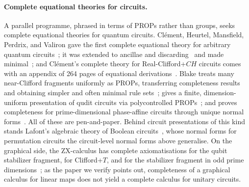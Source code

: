 \paragraph{Complete equational theories for circuits.}
A parallel programme, phrased in terms of PROPs rather than groups,
seeks complete equational theories for quantum circuits.  Cl\'ement,
Heurtel, Mansfield, Perdrix, and Valiron gave the first complete
equational theory for arbitrary quantum
circuits~\cite{clement2023complete}; it was extended to ancillae and
discarding~\cite{clement2024extensions} and made
minimal~\cite{clement2024minimal}; and Cl\'ement's complete theory for
Real-Clifford+$CH$ circuits comes with an appendix of 264 pages of
equational derivations~\cite{clement2026realcliffordch}.  Blake treats
many near-Clifford fragments uniformly as PROPs, transferring
completeness results and obtaining simpler and often minimal rule
sets~\cite{blake2026simpler}; gives a finite, dimension-uniform
presentation of qudit circuits via polycontrolled
PROPs~\cite{blake2026polycontrolled}; and proves completeness for
prime-dimensional phase-affine circuits through unique normal
forms~\cite{blake2026phaseaffine}.  All of these are pen-and-paper.
Behind circuit presentations of this kind stands Lafont's algebraic
theory of Boolean circuits~\cite{lafont2003boolean}, whose normal forms
for permutation circuits the circuit-level normal forms above
generalise.  On the graphical side, the ZX-calculus has complete
axiomatisations for the qubit stabilizer fragment, for Clifford+$T$,
and for the stabilizer fragment in odd prime
dimensions~\cite{backens2014zx,jeandel2018zx,booth2022qupitzx,poor2023travaganza};
as the paper we verify points out, completeness of a graphical calculus
for linear maps does not yield a complete calculus for unitary circuits.

